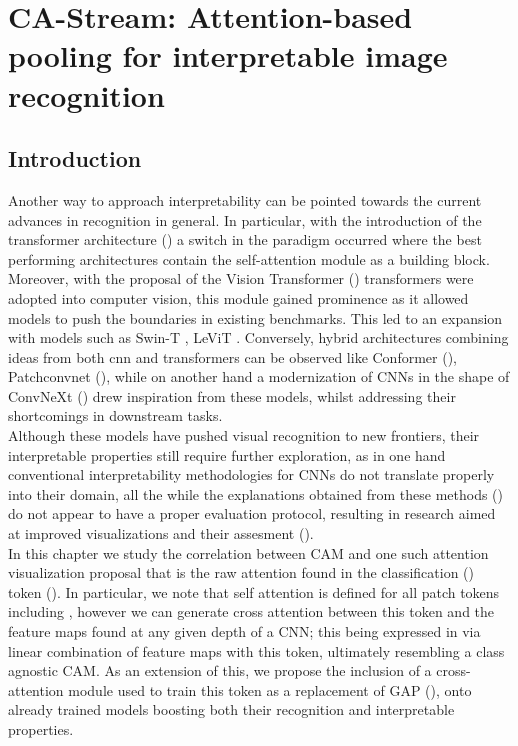 \chapter{CA-Stream: Attention-based pooling for interpretable image recognition}
\chaptertoc{}
\label{ch:castream}
\section{Introduction}
\label{sec:castream_intro}
\noindent Another way to approach interpretability can be pointed towards the current advances in 
recognition in general. In particular, with the introduction of the transformer architecture 
(\cite{vaswani2017attention}) a switch in the paradigm occurred where the best performing 
architectures contain the self-attention module as a building block. Moreover, with the proposal of 
the Vision Transformer (\cite{dosovitskiy2020image}) transformers were adopted into computer vision, 
this module gained prominence as it allowed models to push the boundaries in existing benchmarks. 
This led to an expansion with models such as Swin-T \autocite{liu2021swin}, LeViT 
\cite{graham2021levit}. Conversely, hybrid architectures combining ideas from both \gls{cnn} and 
transformers can be observed like Conformer (\cite{peng2021conformer}), Patchconvnet 
(\cite{touvron2021augmenting}), while on another hand a modernization of CNNs in the shape of 
ConvNeXt (\cite{liu2022convnet}) drew inspiration from these models, whilst addressing their 
shortcomings in downstream tasks.\\

\noindent Although these models have pushed visual recognition to new frontiers, their interpretable
 properties still require further exploration, as in one hand conventional interpretability 
methodologies for CNNs do not translate properly into their domain, all the while the explanations 
obtained from these methods (\cite{abnar2020quantifying}) do not appear to have a proper evaluation 
protocol, resulting in research aimed at improved visualizations and their assesment 
(\cite{chefer2021transformer}).\\

\noindent In this chapter we study the correlation between CAM and one such attention visualization 
proposal that is the raw attention found in the classification (\cls) token (\cite{devlin2018bert}).
In particular, we note that self attention is defined for all patch tokens including \cls, however 
we can generate cross attention between this token and the feature maps found at any given depth 
of a CNN; this being expressed in via linear combination of feature maps with this token, ultimately 
resembling a class agnostic CAM. As an extension of this, we propose the inclusion of a 
cross-attention module used to train this token as a replacement of GAP (\cite{lin2013network}), 
onto already trained models boosting  both their recognition and interpretable properties.

